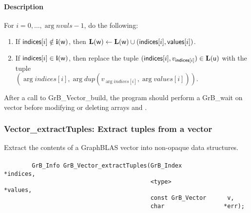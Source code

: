 \paragraph{Description}

For $i = 0,\ldots,\arg{nvals}-1$, do the following:
\begin{enumerate}
    \item If $\arg{indices}[i] \notin \bold{i}(\arg{w})$, then $\bold{L}(\arg{w}) \leftarrow \bold{L}(\arg{w}) \cup (\arg{indices}[i], \arg{values}[i])$.
    \item If $\arg{indices}[i] \in \bold{i}(\arg{w})$, then replace the tuple $(\arg{indices}[i], v_{\arg{indices}[i]}) \in \bold{L}(\arg{u})$ with the tuple \\ $(\arg{indices}[i], \arg{dup}(v_{\arg{indices}[i]},\arg{values}[i]))$.
\end{enumerate}



After a call to {\sf GrB\_Vector\_build}, the program should perform a 
{\sf GrB\_wait} on vector  before
modifying or deleting arrays  and .


\subsubsection{{\sf Vector\_extractTuples}: Extract tuples from a vector}
\label{Sec:Vector_extractTuples}

Extract the contents of a GraphBLAS vector into non-opaque data structures.

\paragraph{\syntax}

\begin{verbatim}
        GrB_Info GrB_Vector_extractTuples(GrB_Index            *indices,
                                          <type>               *values, 
                                          const GrB_Vector      v,
                                          char                 *err);

\end{verbatim}

